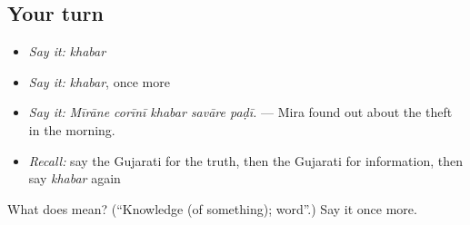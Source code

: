 \subsection*{Your turn}
\begin{itemize}
\raggedright
  \item \emph{Say it:} \emph{khabar}
  \item \emph{Say it:} \emph{khabar}, once more
  \item \emph{Say it:} \emph{Mīrāne corīnī khabar savāre paḍī.} — Mira found out about the theft in the morning.
  \item \emph{Recall:} say the Gujarati for the truth, then the Gujarati for information, then say \emph{khabar} again
\end{itemize}

\begin{tcolorbox}[breakable,colback=teal!4,colframe=teal!35!black,title={Before you move on}]
What does  mean? (\textquotedblleft{}Knowledge (of something); word\textquotedblright{}.) Say it once more.
\end{tcolorbox}
